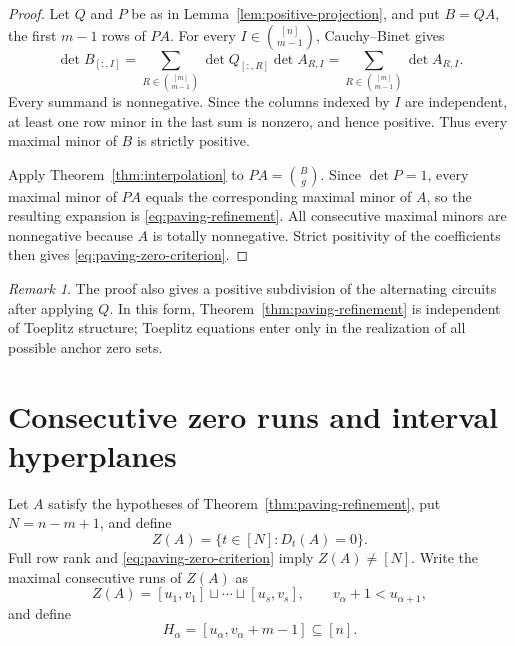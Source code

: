 \documentclass{amsart}
\numberwithin{equation}{section}
\theoremstyle{definition}
\theoremstyle{remark}
\newtheorem{remark}[theorem]{Remark}
\begin{document}
\begin{proof}
Let $Q$ and $P$ be as in Lemma~\ref{lem:positive-projection}, and put $B=QA$, the first $m-1$ rows of $PA$.  For every $I\in\binom{[n]}{m-1}$, Cauchy--Binet gives
\begin{equation}\label{eq:projection-CB}
 \det B_{[:,I]}
 =\sum_{R\in\binom{[m]}{m-1}}
   \det Q_{[:,R]}\det A_{R,I}
 =\sum_{R\in\binom{[m]}{m-1}}\det A_{R,I}.
\end{equation}
Every summand is nonnegative.  Since the columns indexed by $I$ are independent, at least one row minor in the last sum is nonzero, and hence positive.  Thus every maximal minor of $B$ is strictly positive.

Apply Theorem~\ref{thm:interpolation} to $PA=\binom{B}{g}$.  Since $\det P=1$, every maximal minor of $PA$ equals the corresponding maximal minor of $A$, so the resulting expansion is \eqref{eq:paving-refinement}.  All consecutive maximal minors are nonnegative because $A$ is totally nonnegative.  Strict positivity of the coefficients then gives \eqref{eq:paving-zero-criterion}.
\end{proof}

\begin{remark}
The proof also gives a positive subdivision of the alternating circuits after applying $Q$.  In this form, Theorem~\ref{thm:paving-refinement} is independent of Toeplitz structure; Toeplitz equations enter only in the realization of all possible anchor zero sets.
\end{remark}

\section{Consecutive zero runs and interval hyperplanes}\label{sec:paving-support}

Let $A$ satisfy the hypotheses of Theorem~\ref{thm:paving-refinement}, put $N=n-m+1$, and define
\begin{equation}\label{eq:Z}
 Z(A)=\{t\in[N]:D_t(A)=0\}.
\end{equation}
Full row rank and \eqref{eq:paving-zero-criterion} imply $Z(A)\ne[N]$.  Write the maximal consecutive runs of $Z(A)$ as
\begin{equation}\label{eq:runs}
 Z(A)=[u_1,v_1]\sqcup\cdots\sqcup[u_s,v_s],
 \qquad v_\alpha+1<u_{\alpha+1},
\end{equation}
and define
\begin{equation}\label{eq:hyperplanes}
 H_\alpha=[u_\alpha,v_\alpha+m-1]\subseteq[n].
\end{equation}
\end{document}
